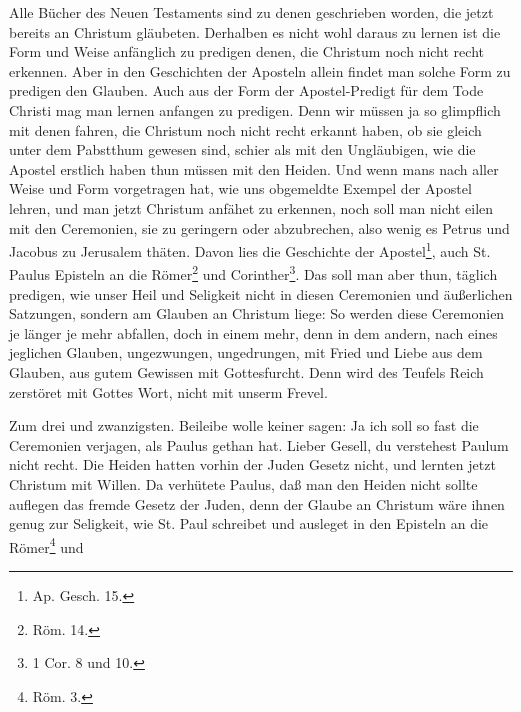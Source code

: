 Alle Bücher des Neuen Testaments sind zu denen geschrieben worden, die jetzt bereits an Christum gläubeten. Derhalben es nicht wohl daraus zu lernen ist die Form und Weise anfänglich zu predigen denen, die Christum noch nicht recht erkennen. Aber in den Geschichten der Aposteln allein findet man solche Form zu predigen den Glauben. Auch aus der Form der Apostel-Predigt für dem Tode Christi mag man lernen anfangen zu
predigen. Denn wir müssen ja so glimpflich mit denen fahren, die Christum noch nicht recht erkannt haben, ob sie gleich unter dem Pabstthum gewesen sind, schier als mit den Ungläubigen, wie die Apostel erstlich haben thun müssen mit den Heiden. Und wenn mans nach aller Weise und Form vorgetragen hat, wie uns obgemeldte Exempel der Apostel lehren, und man jetzt Christum anfähet zu erkennen, noch soll man nicht eilen mit den Ceremonien, sie zu geringern oder abzubrechen, also wenig es Petrus und Jacobus zu Jerusalem thäten. Davon lies die Geschichte der Apostel\footnote{Ap. Gesch. 15.}, auch St. Paulus Episteln an die Römer\footnote{Röm. 14.} und Corinther\footnote{1 Cor. 8 und 10.}. Das soll man aber thun, täglich predigen, wie unser Heil und Seligkeit nicht in diesen Ceremonien und äußerlichen Satzungen, sondern am Glauben an Christum liege: So werden diese Ceremonien je länger je mehr abfallen, doch in einem mehr, denn in dem andern, nach eines jeglichen Glauben, ungezwungen, ungedrungen, mit Fried und Liebe aus dem Glauben, aus gutem Gewissen mit Gottesfurcht. Denn wird des Teufels Reich zerstöret mit Gottes Wort, nicht mit unserm Frevel.

Zum drei und zwanzigsten. Beileibe wolle keiner sagen: Ja ich soll so fast die Ceremonien verjagen, als Paulus gethan hat. Lieber Gesell, du verstehest Paulum nicht recht. Die Heiden hatten vorhin der Juden Gesetz nicht, und lernten jetzt Christum mit Willen. Da verhütete Paulus, daß man den Heiden nicht sollte auflegen das fremde Gesetz der Juden, denn der Glaube an Christum wäre ihnen genug zur Seligkeit, wie St. Paul schreibet und ausleget in den Episteln an die Römer\footnote{Röm. 3.} und

